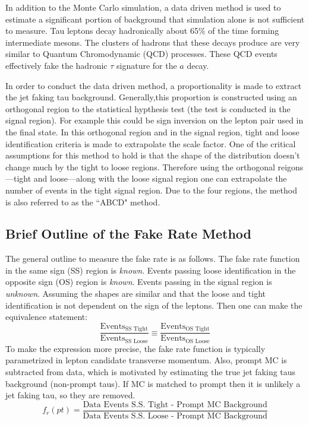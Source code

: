 In addition to the Monte Carlo simulation, a data driven method is used to estimate a significant portion of background that simulation alone is not sufficient to measure. Tau leptons decay hadronically about 65\% of the time forming intermediate mesons. The clusters of hadrons that these decays produce are very similar to Quantum Chromodynamic (QCD) processes. These QCD events effectively fake the hadronic $\tau$ signature for the $a$ decay. 

In order to conduct the data driven method, a proportionality is made to extract the jet faking tau background. Generally,this proportion is constructed using an orthogonal region to the statistical hypthesis test (the test is conducted in the signal region). For example this could be sign inversion on the lepton pair used in the final state. In this orthogonal region and in the signal region, tight and loose identification criteria is made to extrapolate the scale factor. One of the critical assumptions for this method to hold is that the shape of the distribution doesn't change much by the tight to loose regions. Therefore using the orthogonal reigons---tight and loose---along with the loose signal region one can extrapolate the number of events in the tight signal region. Due to the four regions, the method is also referred to as the ``ABCD" method. 


\subsection{Brief Outline of the Fake Rate Method}
The general outline to measure the fake rate is as follows.
The fake rate function in the same sign (SS) region is \textit{known}.
Events passing loose identification in the opposite sign (OS) region is \textit{known}.
Events passing in the signal region is \textit{unknown}. 
Assuming the shapes are similar and that the loose and tight identification is not dependent on the sign of the leptons. Then one can make the equivalence statement: 
\begin{equation}
\label{eq:abcd}
\frac{\text{Events}_\text{SS Tight}}{\text{Events}_\text{SS Loose}} \equiv \frac{\text{Events}_\text{OS Tight}}{\text{Events}_\text{OS Loose}}
\end{equation}
To make the expression more precise, the fake rate function is typically parametrized in lepton candidate transverse momentum. 
 Also, prompt MC is subtracted from data, which is motivated by estimating the true jet faking taus background (non-prompt taus). If MC is matched to prompt then it is unlikely a jet faking tau, so they are removed. 
\begin{equation}f_r(pt)=\frac{\text{Data Events S.S. Tight - Prompt MC Background}}{\text{Data Events S.S. Loose - Prompt MC Background}}\end{equation} 

